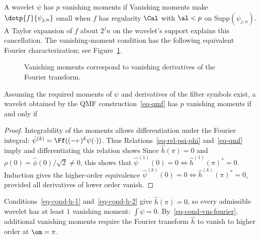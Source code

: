 A wavelet $\psi$ has $p$ vanishing moments if
Vanishing moments make $\dotp{f}{\psi_{j,n}}$ small when $f$ has regularity $\Cal$ with $\al<p$ on Supp$(\psi_{j,n})$. A Taylor expansion of $f$ about $2^j n$ on the wavelet's support explains this cancellation.
%
The vanishing-moment condition has the following equivalent Fourier characterization; see Figure~\ref{fig-vanmoments}.

\begin{figure}[tbp]
\centering
{}
\caption{Vanishing moments correspond to vanishing derivatives of the Fourier transform.}
\label{fig-vanmoments}
\end{figure}

\begin{prop}
Assuming the required moments of $\psi$ and derivatives of the filter symbols exist, a wavelet obtained by the QMF construction~\eqref{eq-qmf} has $p$ vanishing moments if and only if
\end{prop}
\begin{proof}
	Integrability of the moments allows differentiation under the Fourier integral: $\hat\psi^{(k)} = \Ff( (-\imath \cdot)^k \psi(\cdot) )$. Thus
	Relations~\eqref{eq-rel-psi-phi} and~\eqref{eq-qmf} imply
	and differentiating this relation shows	
	Since $\hat h(\pi)=0$ and $\rho(0)=\hat\phi(0)/\sqrt2\neq0$, this shows that $\hat\psi^{(1)}(0)=0 \Leftrightarrow \hat h^{(1)}(\pi)^*=0$.
	Induction gives the higher-order equivalence
	$\hat\psi^{(k)}(0)=0 \Leftrightarrow \hat h^{(k)}(\pi)^*=0$, provided all derivatives of lower order vanish.
\end{proof}

Conditions~\eqref{eq-cond-h-1} and~\eqref{eq-cond-h-2} give $\hat h(\pi)=0$, so every admissible wavelet has at least $1$ vanishing moment: $\int \psi=0$. By~\eqref{eq-cond-vm-fourier}, additional vanishing moments require the Fourier transform $\hat h$ to vanish to higher order at $\om=\pi$.

